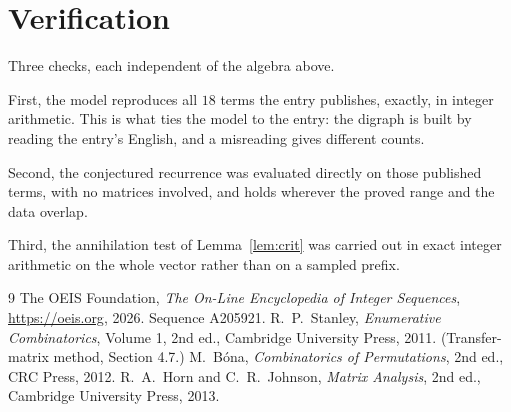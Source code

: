 \documentclass[11pt,a4paper]{article}
\theoremstyle{plain}
\theoremstyle{definition}
\begin{document}
\section{Verification}

Three checks, each independent of the algebra above.

First, the model reproduces all $18$ terms the entry publishes, exactly, in integer
arithmetic. This is what ties the model to the entry: the digraph is built by reading the
entry's English, and a misreading gives different counts.

Second, the conjectured recurrence was evaluated directly on those published terms, with no
matrices involved, and holds wherever the proved range and the data overlap.

Third, the annihilation test of Lemma~\ref{lem:crit} was carried out in exact integer
arithmetic on the whole vector rather than on a sampled prefix.

\begin{thebibliography}{9}
 The OEIS Foundation, \emph{The On-Line Encyclopedia of Integer
Sequences}, \url{https://oeis.org}, 2026. Sequence A205921.
 R.~P.~Stanley, \emph{Enumerative Combinatorics}, Volume 1, 2nd ed.,
Cambridge University Press, 2011. (Transfer-matrix method, Section 4.7.)
 M.~B\'ona, \emph{Combinatorics of Permutations}, 2nd ed., CRC
Press, 2012.
 R.~A.~Horn and C.~R.~Johnson, \emph{Matrix Analysis}, 2nd ed., Cambridge
University Press, 2013.
\end{thebibliography}
\end{document}
